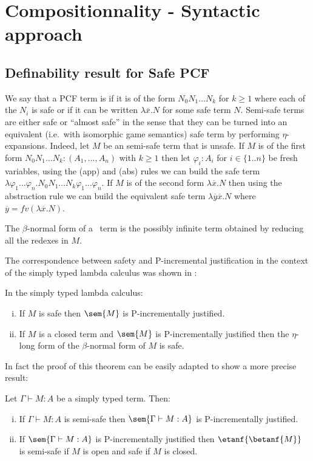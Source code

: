 \section{Compositionnality - Syntactic approach}

\subsection{Definability result for Safe PCF}

We say that a PCF term is  if it is of the form $N_0 N_1 \ldots N_k$ for $k\geq 1$ where each of the $N_i$ is safe or if it can be written $\lambda \overline{x} . N$ for some safe term $N$. Semi-safe terms are either safe or ``almost safe'' in the sense that they can be turned into an equivalent (i.e.~with isomorphic game semantics) safe term  by performing $\eta$-expansions. Indeed, let $M$ be an semi-safe term that is unsafe.
If $M$ is of the first form $N_0 N_1 \ldots N_k : (A_1,\ldots,A_n)$ with $k\geq 1$ then let $\varphi_i:A_i$ for $i\in\{1..n\}$ be fresh variables, using the (app) and (abs) rules we can build the safe term $\lambda \varphi_1 \ldots \varphi_n . N_0 N_1 \ldots N_k \varphi_1 \ldots \varphi_n$. If $M$ is of the second form $\lambda \overline{x} . N$ then using the abstraction rule we can build the equivalent safe term $\lambda \overline{y} \overline{x}. N$  where $\overline{y} = fv(\lambda \overline{x}. N)$.

The $\beta$-normal form of a \pcf\ term is the possibly infinite term obtained by reducing all the redexes in $M$.

The correspondence between safety and P-incremental justification in the context of the simply typed lambda calculus was shown
in \cite[Theorem 3(ii)]{blumong:safelambdacalculus}:

\begin{theorem}
\label{thm:safeincrejust} In the simply typed lambda calculus:
\begin{enumerate}[(i)]
\item If $M$ is safe then $\sem{M}$ is P-incrementally justified.
\item If $M$ is a closed term and $\sem{M}$ is
  P-incrementally justified then the $\eta$-long form of the
  $\beta$-normal form of $M$ is safe.
\end{enumerate}
\end{theorem}
In fact the proof of this theorem can be easily adapted to show a more precise result:
\begin{theorem}
\label{thm:semisafeincrejust} Let $\Gamma \vdash M : A$ be a simply typed term. Then:
\begin{enumerate}[(i)]
\item If $\Gamma \vdash M : A$ is semi-safe then $\sem{\Gamma \vdash M : A}$ is P-incrementally justified.
\item If $\sem{\Gamma \vdash M : A}$ is
  P-incrementally justified then 
$\etanf{\betanf{M}}$ is semi-safe if $M$ is open
and safe if $M$ is closed.
\end{enumerate}
\end{theorem}



